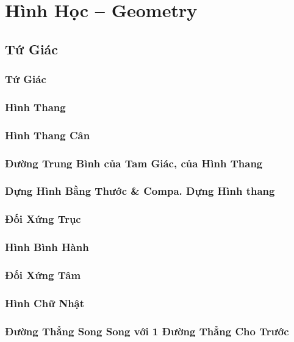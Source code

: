 \documentclass[oneside]{book}
\numberwithin{equation}{section}
\begin{document}
\part{Hình Học -- Geometry}

\chapter{Tứ Giác}

\section{Tứ Giác}

\section{Hình Thang}

\section{Hình Thang Cân}

\section{Đường Trung Bình của Tam Giác, của Hình Thang}

\section{Dựng Hình Bằng Thước \& Compa. Dựng Hình thang}

\section{Đối Xứng Trục}

\section{Hình Bình Hành}

\section{Đối Xứng Tâm}

\section{Hình Chữ Nhật}

\section{Đường Thẳng Song Song với 1 Đường Thẳng Cho Trước}
\end{document}

